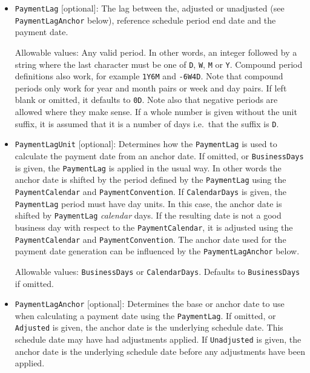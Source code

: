 \begin{itemize}
\begin{itemize}
  \item \lstinline!PaymentLag! [optional]:
  The lag between the, adjusted or unadjusted (see \lstinline!PaymentLagAnchor! below), reference schedule period end 
  date and the payment date.

  Allowable values: Any valid period.
  In other words, an integer followed by a string where the last character must be one of 
  \lstinline!D!, \lstinline!W!, \lstinline!M! or \lstinline!Y!.
  Compound period definitions also work, for example \lstinline!1Y6M! and \lstinline!-6W4D!.
  Note that compound periods only work for year and month pairs or week and day pairs.
  If left blank or omitted, it defaults to \lstinline!0D!.
  Note also that negative periods are allowed where they make sense.
  If a whole number is given without the unit suffix, it is assumed that it is a number of days i.e.\ 
  that the suffix is \lstinline!D!.

  \item \lstinline!PaymentLagUnit! [optional]:
  Determines how the \lstinline!PaymentLag! is used to calculate the payment date from an anchor date.
  If omitted, or \lstinline!BusinessDays! is given, the \lstinline!PaymentLag! is applied in the usual way.
  In other words the anchor date is shifted by the period defined by the \lstinline!PaymentLag! using the 
  \lstinline!PaymentCalendar! and \lstinline!PaymentConvention!.
  If \lstinline!CalendarDays! is given, the \lstinline!PaymentLag! period must have day units.
  In this case, the anchor date is shifted by \lstinline!PaymentLag! \emph{calendar} days.
  If the resulting date is not a good business day with respect to the \lstinline!PaymentCalendar!,
  it is adjusted using the \lstinline!PaymentCalendar! and \lstinline!PaymentConvention!.
  The anchor date used for the payment date generation can be influenced by the \lstinline!PaymentLagAnchor! below.

  Allowable values: \lstinline!BusinessDays! or \lstinline!CalendarDays!.
  Defaults to \lstinline!BusinessDays! if omitted.

  \item \lstinline!PaymentLagAnchor! [optional]:
  Determines the base or anchor date to use when calculating a payment date using the \lstinline!PaymentLag!.
  If omitted, or \lstinline!Adjusted! is given, the anchor date is the underlying schedule date.
  This schedule date may have had adjustments applied.
  If \lstinline!Unadjusted! is given, the anchor date is the underlying schedule date 
  before any adjustments have been applied.


\end{itemize}
\end{itemize}
